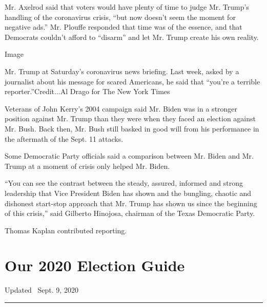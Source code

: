 Mr. Axelrod said that voters would have plenty of time to judge Mr.
Trump's handling of the coronavirus crisis, ``but now doesn't seem the
moment for negative ads.'' Mr. Plouffe responded that time was of the
essence, and that Democrats couldn't afford to ``disarm'' and let Mr.
Trump create his own reality.

Image

Mr. Trump at Saturday's coronavirus news briefing. Last week, asked by a
journalist about his message for scared Americans, he said that ``you're
a terrible reporter.''Credit...Al Drago for The New York Times

Veterans of John Kerry's 2004 campaign said Mr. Biden was in a stronger
position against Mr. Trump than they were when they faced an election
against Mr. Bush. Back then, Mr. Bush still basked in good will from his
performance in the aftermath of the Sept. 11 attacks.

Some Democratic Party officials said a comparison between Mr. Biden and
Mr. Trump at a moment of crisis only helped Mr. Biden.

``You can see the contrast between the steady, assured, informed and
strong leadership that Vice President Biden has shown and the bungling,
chaotic and dishonest start-stop approach that Mr. Trump has shown us
since the beginning of this crisis,'' said Gilberto Hinojosa, chairman
of the Texas Democratic Party.

Thomas Kaplan contributed reporting.

\hypertarget{our-2020-election-guide}{%
\section{Our 2020 Election Guide}\label{our-2020-election-guide}}

Updated ~Sept. 9, 2020

\begin{center}\rule{0.5\linewidth}{\linethickness}\end{center}

